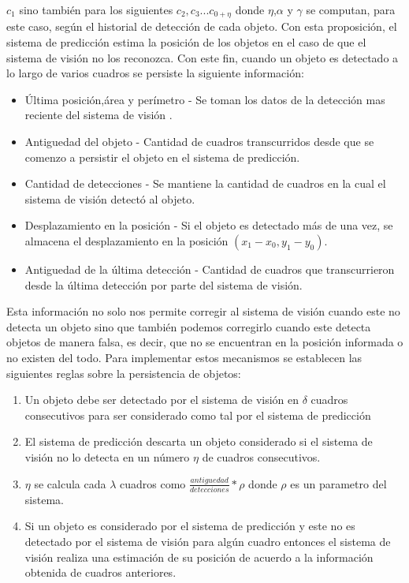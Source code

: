 $c_1$ sino también para los siguientes $c_2,c_3 ... c_{0+\eta}$ donde 
$\eta$,$\alpha$ y $\gamma$ se computan, para este caso, según el 
historial de detección de cada objeto.  Con esta proposición, el 
sistema de predicción estima la posición de los objetos en el caso de 
que el sistema de visión no los reconozca. Con este fin, cuando un objeto es detectado a lo largo de varios cuadros se persiste la siguiente información:
\begin{itemize}
\item{ Última posición,área y perímetro - Se toman los datos de la detección mas reciente del sistema de visión .}
\item{ Antiguedad del objeto - Cantidad de cuadros transcurridos desde que se comenzo a persistir el objeto en el sistema de predicción.}
\item{ Cantidad de detecciones - Se mantiene la cantidad de cuadros en la cual el sistema de visión detectó al objeto.}
\item{ Desplazamiento en la posición - Si el objeto es detectado más 
de una vez, se almacena el desplazamiento en la posición $(x_1 - x_0 , y_1 - y_0 )$.}
\item{ Antiguedad de la última detección - Cantidad de cuadros que transcurrieron desde la última detección por parte del sistema de visión.}  
\end{itemize}
Esta información no solo nos permite corregir al sistema de visión 
cuando este no detecta un objeto sino que también podemos corregirlo 
cuando este detecta objetos de manera falsa, es decir, que no se 
encuentran en la posición informada o no existen del todo. Para 
implementar estos mecanismos se establecen las siguientes reglas sobre 
la persistencia de objetos:
\begin{enumerate}
\item{Un objeto debe ser detectado por el sistema de visión en $\delta$ 
cuadros consecutivos para ser considerado como tal por el sistema de 
predicción}
\item{El sistema de predicción descarta un objeto considerado si el 
sistema de visión no lo detecta en un número $\eta$ de cuadros 
consecutivos.}
\item{ $\eta$ se calcula cada $\lambda$ cuadros como 
$\frac{antiguedad}{detecciones}*\rho$ donde $\rho$ es un parametro del 
sistema}.
\item{ Si un objeto es considerado por el sistema de predicción y este 
no es detectado por el sistema de visión para algún cuadro entonces 
el sistema de visión realiza una estimación de su posición de 
acuerdo a la información obtenida de cuadros anteriores.}
\end{enumerate}

